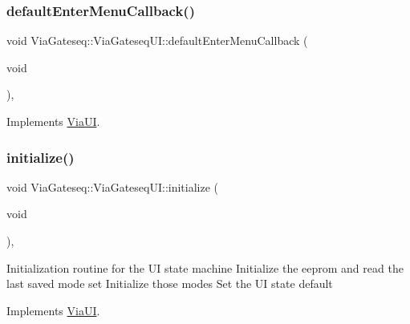 \mbox{\label{class_via_gateseq_1_1_via_gateseq_u_i_ad71d38b0b6b8c29e9f93e0fe6d2c40fc}} 
\subsubsection{\texorpdfstring{default\+Enter\+Menu\+Callback()}{defaultEnterMenuCallback()}}
{\footnotesize\ttfamily void Via\+Gateseq\+::\+Via\+Gateseq\+U\+I\+::default\+Enter\+Menu\+Callback (\begin{DoxyParamCaption}\item[{void}]{ }\end{DoxyParamCaption})\hspace{0.3cm}{\ttfamily [override]}, {\ttfamily [virtual]}}



Implements \mbox{\hyperlink{class_via_u_i_a226eb7b65b6035a611dd734d965fa7c2}{Via\+UI}}.

\mbox{\label{class_via_gateseq_1_1_via_gateseq_u_i_ae59b0d739f92892cf9a0d16cd3d25bfa}} 
\subsubsection{\texorpdfstring{initialize()}{initialize()}}
{\footnotesize\ttfamily void Via\+Gateseq\+::\+Via\+Gateseq\+U\+I\+::initialize (\begin{DoxyParamCaption}\item[{void}]{ }\end{DoxyParamCaption})\hspace{0.3cm}{\ttfamily [override]}, {\ttfamily [virtual]}}

Initialization routine for the UI state machine Initialize the eeprom and read the last saved mode set Initialize those modes Set the UI state default 

Implements \mbox{\hyperlink{class_via_u_i_a573ba7aef8f4982ec4900258c770bdbb}{Via\+UI}}.

